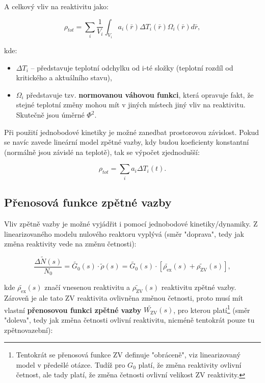 A celkový vliv na reaktivitu jako:

\begin{equation}
  \boxed{
  \rho_{tot} = \sum_i \dfrac{1}{V_i} \int_{V_i} a_i(\bar{r}) \Delta T_i(\bar{r}) \Omega_i(\bar{r}) d\bar{r},
  \label{zpetnovazebni_koeficient_reaktivita}
  }
\end{equation}

kde:

\begin{itemize}
  \item $\Delta T_i$ -- představuje teplotní odchylku od i-té složky (teplotní rozdíl od kritického a aktuálního stavu),
  \item $\Omega_i$ představuje tzv. \textbf{normovanou váhovou funkci}, která opravuje fakt, že stejné teplotní změny mohou mít v jiných místech jiný vliv na reaktivitu. Skutečně jsou úměrné $\Phi^2$.
\end{itemize}

Při použití jednobodové kinetiky je možné zanedbat prostorovou závislost. Pokud se navíc zavede lineární model zpětné vazby, kdy budou koeficienty konstantní (normálně jsou závislé na teplotě), tak se výpočet zjednodušší:

\begin{equation}
  \boxed{
  \rho_{tot} = \sum_i a_i \Delta T_i (t).
  \label{zpetnovazebni_koeficient_reaktivita_1B}
  }
\end{equation}

\subsection{Přenosová funkce zpětné vazby}

Vliv zpětně vazby je možné vyjádřit i pomocí jednobodové kinetiky/dynamiky. Z linearizovaného modelu nulového reaktoru vyplývá (směr "doprava", tedy jak změna reaktivity vede na změnu četnosti):

$$ \dfrac{\Delta \tilde{N}(s)}{N_0} = \tilde{G_0}(s) \cdot \tilde{\rho}(s) = \tilde{G_0}(s) \cdot [ \tilde{\rho_\text{ex}}(s) + \tilde{\rho_\text{ZV}}(s) ], $$

kde $\tilde{\rho_\text{ex}}(s)$ značí vnesenou reaktivitu a $\tilde{\rho_\text{ZV}}(s)$ reaktivitu zpětné vazby. Zároveň je ale tato ZV reaktivita ovlivněna změnou četnosti, proto musí mít vlastní \textbf{přenosovou funkci zpětné vazby} $\tilde{W_\text{ZV}}(s)$, pro kterou platí\footnote{Tentokrát se přenosová funkce ZV definuje "obráceně", viz linearizovaný model v předešlé otázce. Tudíž pro $G_0$ platí, že změna reaktivity ovlivní četnost, ale tady platí, že změna četnosti ovlivní velikost ZV reaktivity.} (směr "doleva", tedy jak změna četnosti ovlivní reaktivitu, nicméně tentokrát pouze tu zpětnovazební):

